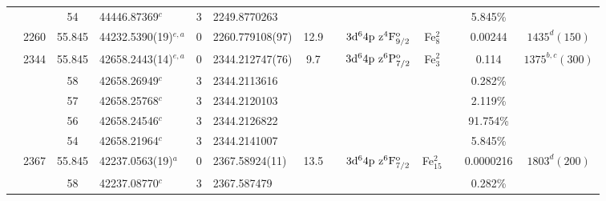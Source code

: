 \begin{table*}
\begin{center}
{\begin{tabular}{:l;l;c;l;c;l;c;l;l;c;c;c;c}
\rowstyle{\itshape}               &        & 54        & 44446.87369$^{c}$                & 3 &  2249.8770263      &      & $                                        $ & $                                        $ &             &              & 5.845\%   & $     ^{}     $\\
                                  & 2260   & 55.845    & 44232.5390(19)$^{e,a}$           & 0 &   2260.779108(97)  & 12.9 & $                                        $ & $3\rm{d}^64\rm{p~z}^4\rm{F}_{9/2}^{\rm o}$ & Fe$^2_{8}$  &              & 0.00244   & $ 1435^{d}(150)$\\
                                  & 2344   & 55.845    & 42658.2443(14)$^{e,a}$           & 0 &   2344.212747(76)  &  9.7 & $                                        $ & $3\rm{d}^64\rm{p~z}^6\rm{P}_{7/2}^{\rm o}$ & Fe$^2_{3}$  &              & 0.114     & $ 1375^{b,c}(300)$\\
\rowstyle{\itshape}               &        & 58        & 42658.26949$^{c}$                & 3 &  2344.2113616      &      & $                                        $ & $                                        $ &             &              & 0.282\%   & $     ^{}     $\\
\rowstyle{\itshape}               &        & 57        & 42658.25768$^{c}$                & 3 &  2344.2120103      &      & $                                        $ & $                                        $ &             &              & 2.119\%   & $     ^{}     $\\
\rowstyle{\itshape}               &        & 56        & 42658.24546$^{c}$                & 3 &  2344.2126822      &      & $                                        $ & $                                        $ &             &              & 91.754\%  & $     ^{}     $\\
\rowstyle{\itshape}               &        & 54        & 42658.21964$^{c}$                & 3 &  2344.2141007      &      & $                                        $ & $                                        $ &             &              & 5.845\%   & $     ^{}     $\\
                                  & 2367   & 55.845    & 42237.0563(19)$^{a}$             & 0 &    2367.58924(11)  & 13.5 & $                                        $ & $3\rm{d}^64\rm{p~z}^6\rm{F}_{7/2}^{\rm o}$ & Fe$^2_{15}$ &              & 0.0000216 & $ 1803^{d}(200)$\\
\rowstyle{\itshape}               &        & 58        & 42237.08770$^{c}$                & 3 &   2367.587479      &      & $                                        $ & $                                        $ &             &              & 0.282\%   & $     ^{}     $\\

\end{tabular}}
\end{center}
\end{table*}
